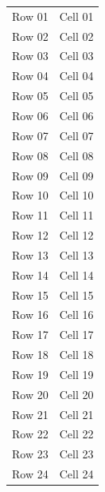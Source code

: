 \documentclass{article}\usepackage[paperheight=70mm,paperwidth=110mm,margin=10mm]{geometry}\usepackage{longtable}
\begin{document}
\begin{longtable}{ll}
Row 01 & Cell 01 \\
Row 02 & Cell 02 \\
Row 03 & Cell 03 \\
Row 04 & Cell 04 \\
Row 05 & Cell 05 \\
Row 06 & Cell 06 \\
Row 07 & Cell 07 \\
Row 08 & Cell 08 \\
Row 09 & Cell 09 \\
Row 10 & Cell 10 \\
Row 11 & Cell 11 \\
Row 12 & Cell 12 \\
Row 13 & Cell 13 \\
Row 14 & Cell 14 \\
Row 15 & Cell 15 \\
Row 16 & Cell 16 \\
Row 17 & Cell 17 \\
Row 18 & Cell 18 \\
Row 19 & Cell 19 \\
Row 20 & Cell 20 \\
Row 21 & Cell 21 \\
Row 22 & Cell 22 \\
Row 23 & Cell 23 \\
Row 24 & Cell 24 \\
\end{longtable}
\end{document}
